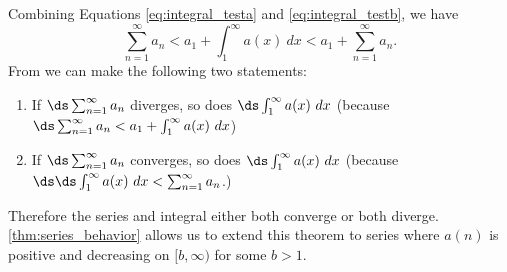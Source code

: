Combining Equations \eqref{eq:integral_testa} and \eqref{eq:integral_testb}, we have
\begin{equation}\sum_{n=1}^\infty a_n< a_1 +\int_1^\infty a(x)\ dx < a_1 + \sum_{n=1}^\infty a_n.\label{eq:integral_testc}\end{equation}
From  we can make the following two statements:
\begin{enumerate}
	\item If $\ds \sum_{n=1}^\infty a_n$ diverges, so does $\ds\int_1^\infty a(x)\ dx$ \quad (because $\ds \sum_{n=1}^\infty a_n < a_1 +\int_1^\infty a(x)\ dx$)
	\item	If $\ds \sum_{n=1}^\infty a_n$ converges, so does $\ds\int_1^\infty a(x)\ dx$ \quad (because $\ds \ds \int_1^\infty a(x)\ dx < \sum_{n=1}^\infty a_n$.)
\end{enumerate}
Therefore the series and integral either both converge or both diverge. \autoref{thm:series_behavior} allows us to extend this theorem to series where $a(n)$ is positive and decreasing on $[b,\infty)$ for some $b>1$.


